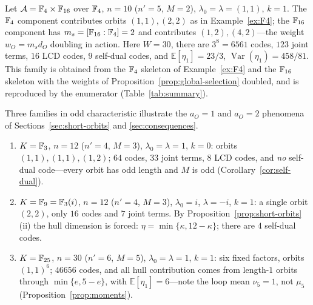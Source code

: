 \begin{example}\label{ex:mixed}
Let $\mathcal A=\mathbb F_4\times\mathbb F_{16}$ over $\mathbb F_4$, $n=10$ ($n'=5$, $M=2$),
$\lambda_0=\lambda=(1,1)$, $k=1$.  The $\mathbb F_4$ component contributes orbits
$(1,1),(2,2)$ as in Example~\ref{ex:F4}; the $\mathbb F_{16}$ component has
$m_s=[\mathbb F_{16}:\mathbb F_4]=2$ and contributes $(1,2),(4,2)$---the weight
$w_O=m_sd_O$ doubling in action.  Here $W=30$, there are $3^8=6561$ codes,
$123$ joint terms, $16$ LCD codes, $9$ self-dual codes, and
$\mathbb{E}[\eta_1]=23/3$, $\operatorname{Var}(\eta_1)=458/81$.  This family
is obtained from the $\mathbb F_4$ skeleton of Example~\ref{ex:F4} and the
$\mathbb F_{16}$ skeleton with the weights of Proposition~\ref{prop:global-selection}
doubled, and is reproduced by the enumerator (Table~\ref{tab:summary}).
\end{example}

\begin{example}\label{ex:char35}
Three families in odd characteristic illustrate the $a_O=1$ and $a_O=2$
phenomena of Sections~\ref{sec:short-orbits} and
\ref{sec:consequences}.
\begin{enumerate}
\item[\textup{(a)}] $K=\mathbb F_3$, $n=12$ ($n'=4$, $M=3$), $\lambda_0=\lambda=1$,
$k=0$: orbits $(1,1),(1,1),(1,2)$; $64$ codes, $33$ joint terms, $8$ LCD
codes, and \emph{no} self-dual code---every orbit has odd length and $M$
is odd (Corollary~\ref{cor:self-dual}).
\item[\textup{(b)}] $K=\mathbb F_9=\mathbb F_3(i)$, $n=12$ ($n'=4$, $M=3$),
$\lambda_0=i$, $\lambda=-i$, $k=1$: a single orbit $(2,2)$, only $16$ codes
and $7$ joint terms.  By Proposition~\ref{prop:short-orbits}(ii) the hull
dimension is forced: $\eta=\min\{\kappa,12-\kappa\}$; there are $4$ self-dual
codes.
\item[\textup{(c)}] $K=\mathbb F_{25}$, $n=30$ ($n'=6$, $M=5$),
$\lambda_0=\lambda=1$, $k=1$: six fixed factors, orbits $(1,1)^6$; $46656$
codes, and all hull contribution comes from length-$1$ orbits through
$\min\{e,5-e\}$, with $\mathbb{E}[\eta_1]=6$---note the loop mean
$\nu_5=1$, not $\mu_5$ (Proposition~\ref{prop:moments}).
\end{enumerate}
\end{example}

